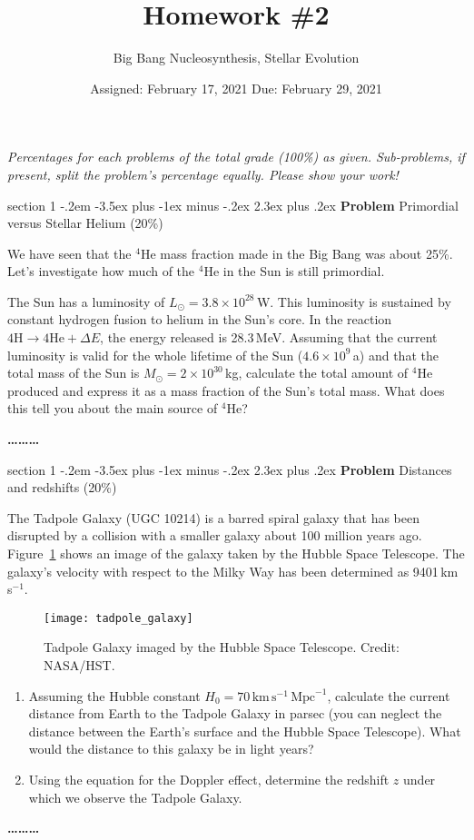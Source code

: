 \documentclass[letterpaper,12pt,twoside=false,DIV=11]{scrartcl}
\makeatletter
\newcommand{\topic}{\author}
\newenvironment{problem}{\@startsection
    {section}
    {1}
    {-.2em}
    {-3.5ex plus -1ex minus -.2ex}
    {2.3ex plus .2ex}
    {
        \pagebreak[3] %
        \noindent\sffamily\bfseries Problem
    }
}
{
    \begin{center}\large\bfseries\ldots\ldots\ldots\end{center}
}
\providecommand{\ex}[1]{\ensuremath{^{#1}}}
\makeatother
\begin{document}
\title{Homework \#2}
\topic{Big Bang Nucleosynthesis, Stellar Evolution}
\date{Assigned: February 17, 2021 \qquad Due: February 29, 2021}

\maketitle
\thispagestyle{fancy}


\noindent\emph{Percentages for each problems of the total grade (100\%) as given. Sub-problems, if present, split the problem's percentage equally. Please show your work!}

\begin{problem}{Primordial versus Stellar Helium (20\%)}

We have seen that the \ex{4}He mass fraction made in the Big Bang was about 25\%. Let's investigate how much of the \ex{4}He in the Sun is still primordial. 

The Sun has a luminosity of $L_\odot = 3.8\times 10^{28}$\,W. This luminosity is sustained by constant hydrogen fusion to helium in the Sun's core. In the reaction $4\mathrm{H} \longrightarrow 4\mathrm{He} + \Delta E$, the energy released is 28.3\,MeV. Assuming that the current luminosity is valid for the whole lifetime of the Sun ($4.6\times 10^{9}$\,a) and that the total mass of the Sun is $M_\odot = 2\times 10^{30}$\,kg, calculate the total amount of \ex{4}He produced and express it as a mass fraction of the Sun's total mass. What does this tell you about the main source of \ex{4}He?

\end{problem}

\begin{problem}{Distances and redshifts (20\%)}

The Tadpole Galaxy (UGC 10214) is a barred spiral galaxy that has been disrupted by a collision with a smaller galaxy about 100 million years ago. Figure~\ref{fig:tadpole_galaxy} shows an image of the galaxy taken by the Hubble Space Telescope. 
The galaxy's velocity with respect to the Milky Way has been determined as 9401\,km\,s$^{-1}$. 
\begin{figure}[tb]
    \centering
    \texttt{[image: tadpole\_galaxy]}
    \caption{Tadpole Galaxy imaged by the Hubble Space Telescope. Credit: NASA/HST.}
    \label{fig:tadpole_galaxy}
\end{figure}

\begin{enumerate}
    \item Assuming the Hubble constant $H_0 = 70\,\mathrm{km}\,\mathrm{s}^{-1}\,\mathrm{Mpc}^{-1}$, calculate the current distance from Earth to the Tadpole Galaxy in parsec (you can neglect the distance between the Earth's surface and the Hubble Space Telescope). What would the distance to this galaxy be in light years?
    \item Using the equation for the Doppler effect, determine the redshift $z$ under which we observe the Tadpole Galaxy.
\end{enumerate}

\end{problem}
\end{document}
